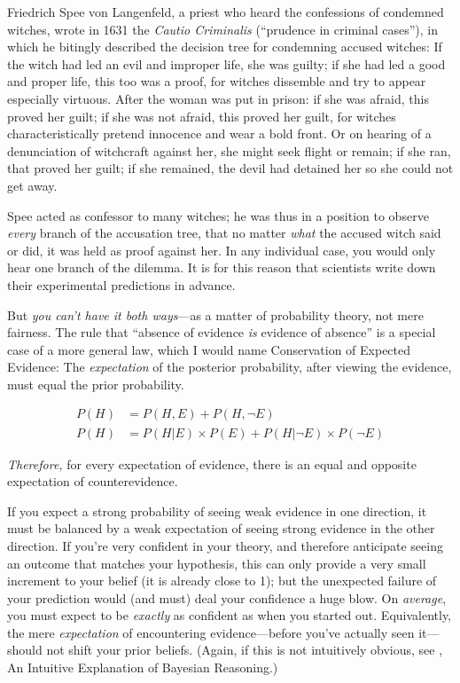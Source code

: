 \myendsectiontext


\bigskip


{
 Friedrich Spee von Langenfeld, a priest who heard the confessions
of condemned witches, wrote in 1631 the \textit{Cautio Criminalis}
(``prudence in criminal cases''), in
which he bitingly described the decision tree for condemning accused
witches: If the witch had led an evil and improper life, she was
guilty; if she had led a good and proper life, this too was a proof,
for witches dissemble and try to appear especially virtuous. After the
woman was put in prison: if she was afraid, this proved her guilt; if
she was not afraid, this proved her guilt, for witches
characteristically pretend innocence and wear a bold front. Or on
hearing of a denunciation of witchcraft against her, she might seek
flight or remain; if she ran, that proved her guilt; if she remained,
the devil had detained her so she could not get away. }

{
 Spee acted as confessor to many witches; he was thus in a position
to observe \textit{every} branch of the accusation tree, that no matter
\textit{what} the accused witch said or did, it was held as proof
against her. In any individual case, you would only hear one branch of
the dilemma. It is for this reason that scientists write down their
experimental predictions in advance.}

{
 But \textit{you can't have it both ways}{}---as a
matter of probability theory, not mere fairness. The rule that
``absence of evidence \textit{is} evidence of
absence'' is a special case of a more general law,
which I would name Conservation of Expected Evidence: The
\textit{expectation} of the posterior probability, after viewing the
evidence, must equal the prior probability.}

\begin{align*}
 P(H) &= P(H,E) + P(H,\lnot E) \\
 P(H) &= P(H|E) \times P(E) + P(H|\lnot E) \times P(\lnot E)
\end{align*}

{
 \textit{Therefore,} for every expectation of evidence, there is an
equal and opposite expectation of counterevidence.}

{
 If you expect a strong probability of seeing weak evidence in one
direction, it must be balanced by a weak expectation of seeing strong
evidence in the other direction. If you're very
confident in your theory, and therefore anticipate seeing an outcome
that matches your hypothesis, this can only provide a very small
increment to your belief (it is already close to 1); but the unexpected
failure of your prediction would (and must) deal your confidence a huge
blow. On \textit{average}, you must expect to be \textit{exactly} as
confident as when you started out. Equivalently, the mere
\textit{expectation} of encountering evidence---before
you've actually seen it---should not shift your prior
beliefs. (Again, if this is not intuitively obvious, see \pageref{intuitive_bayesian}, An Intuitive
Explanation of Bayesian Reasoning.)}

